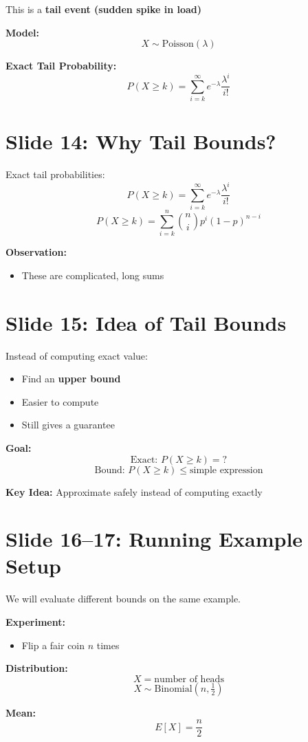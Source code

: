 \documentclass[12pt]{article}
\begin{document}
This is a \textbf{tail event (sudden spike in load)}  

\textbf{Model:}
\[
X \sim \text{Poisson}(\lambda)
\]

\textbf{Exact Tail Probability:}
\[
P(X \ge k) = \sum_{i=k}^{\infty} e^{-\lambda} \frac{\lambda^i}{i!}
\]

\section*{Slide 14: Why Tail Bounds?}
Exact tail probabilities:
\[
P(X \ge k) = \sum_{i=k}^{\infty} e^{-\lambda} \frac{\lambda^i}{i!}
\]
\[
P(X \ge k) = \sum_{i=k}^{n} \binom{n}{i} p^i (1-p)^{n-i}
\]

\textbf{Observation:}
\begin{itemize}
\item These are complicated, long sums  
\end{itemize}

\section*{Slide 15: Idea of Tail Bounds}
Instead of computing exact value:
\begin{itemize}
\item Find an \textbf{upper bound}  
\item Easier to compute  
\item Still gives a guarantee  
\end{itemize}

\textbf{Goal:}
\[
\text{Exact: } P(X \ge k) = ?
\]
\[
\text{Bound: } P(X \ge k) \le \text{simple expression}
\]

\textbf{Key Idea:}  
Approximate safely instead of computing exactly  

\section*{Slide 16–17: Running Example Setup}
We will evaluate different bounds on the same example.

\textbf{Experiment:}
\begin{itemize}
\item Flip a fair coin \( n \) times  
\end{itemize}

\textbf{Distribution:}
\[
X = \text{number of heads}
\]
\[
X \sim \text{Binomial}(n, \tfrac{1}{2})
\]

\textbf{Mean:}
\[
E[X] = \frac{n}{2}
\]
\end{document}
